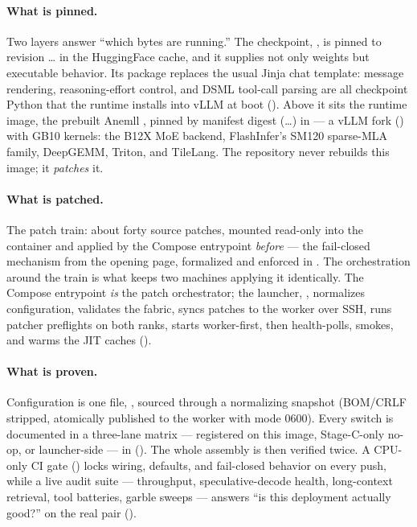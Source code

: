 \paragraph{What is pinned.} Two layers answer ``which bytes are running.''
The checkpoint, , is pinned
to revision \ldots{} in the HuggingFace cache, and it
supplies not only weights but executable behavior. Its
 package replaces the usual Jinja chat
template: message rendering, reasoning-effort control, and DSML tool-call
parsing are all checkpoint Python that the runtime installs into vLLM at
boot (). Above it sits the runtime image, the prebuilt
Anemll , pinned by
manifest digest (\ldots) in
 --- a vLLM fork
() with GB10 kernels: the B12X MoE backend,
FlashInfer's SM120 sparse-MLA family, DeepGEMM, Triton, and TileLang. The
repository never rebuilds this image; it \emph{patches} it.

\paragraph{What is patched.} The patch train: about forty source patches,
mounted read-only into the container and applied by the Compose entrypoint
\emph{before}  --- the fail-closed mechanism from the
opening page, formalized and enforced in . The
orchestration around the train is what keeps two machines applying it
identically. The Compose entrypoint \emph{is} the patch orchestrator; the
launcher, , normalizes
configuration, validates the fabric, syncs patches to the worker over SSH,
runs patcher preflights on both ranks, starts worker-first, then
health-polls, smokes, and warms the JIT caches ().

\paragraph{What is proven.} Configuration is one file,
, sourced through a normalizing snapshot (BOM/CRLF
stripped, atomically published to the worker with mode 0600). Every switch
is documented in a three-lane matrix --- registered on this image,
Stage-C-only no-op, or launcher-side --- in 
(). The whole assembly is then verified twice. A CPU-only
CI gate () locks wiring, defaults, and
fail-closed behavior on every push, while a live audit suite ---
throughput, speculative-decode health, long-context retrieval, tool
batteries, garble sweeps --- answers ``is this deployment actually good?''
on the real pair ().

